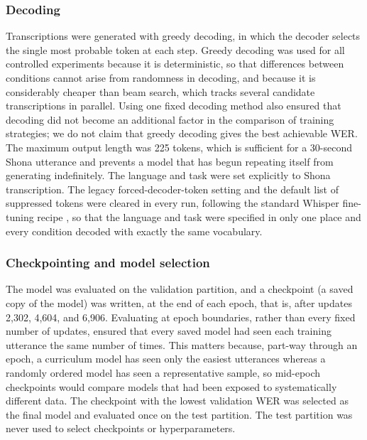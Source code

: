 \subsubsection{Decoding}
\label{sec:decoding}

Transcriptions were generated with greedy decoding, in which the decoder selects
the single most probable token at each step. Greedy decoding was used for all
controlled experiments because it is deterministic, so that differences between
conditions cannot arise from randomness in decoding, and because it is
considerably cheaper than beam search, which tracks several candidate
transcriptions in parallel. Using one fixed decoding method also ensured that
decoding did not become an additional factor in the comparison of training
strategies; we do not claim that greedy decoding gives the best achievable WER.
The maximum output length was 225 tokens, which is sufficient for a 30-second
Shona utterance and prevents a model that has begun repeating itself from
generating indefinitely. The language and task were set explicitly to Shona
transcription. The legacy forced-decoder-token setting and the default list of
suppressed tokens were cleared in every run, following the standard Whisper
fine-tuning recipe \citep{Gandhi2022}, so that the language and task were
specified in only one place and every condition decoded with exactly the same
vocabulary.

\subsubsection{Checkpointing and model selection}
\label{sec:checkpointing}

The model was evaluated on the validation partition, and a checkpoint (a saved
copy of the model) was written, at the end of each epoch, that is, after updates
2,302, 4,604, and 6,906. Evaluating at epoch boundaries, rather than every fixed
number of updates, ensured that every saved model had seen each training
utterance the same number of times. This matters because, part-way through an
epoch, a curriculum model has seen only the easiest utterances whereas a randomly
ordered model has seen a representative sample, so mid-epoch checkpoints would
compare models that had been exposed to systematically different data. The
checkpoint with the lowest validation WER was selected as the final model and
evaluated once on the test partition. The test partition was never used to select
checkpoints or hyperparameters.



